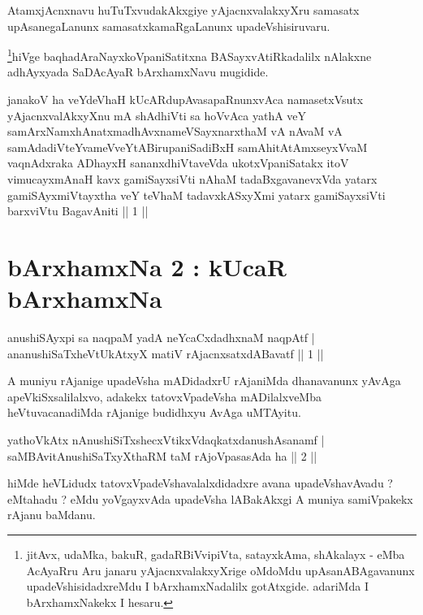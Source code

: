 \begin{artha}
AtamxjAcnxnavu huTuTxvudakAkxgiye yAjacnxvalakxyXru samasatx upAsanegaLanunx samasatxkamaRgaLanunx upadeVshisiruvaru.
\end{artha}

\begin{artha}
\footnote{jitAvx, udaMka, bakuR, gadaRBiVvipiVta, satayxkAma, shAkalayx - eMba AcAyaRru Aru janaru yAjacnxvalakxyXrige oMdoMdu upAsanABAgavanunx upadeVshisidadxreMdu I bArxhamxNadalilx gotAtxgide. adariMda I bArxhamxNakekx I hesaru.}hiVge baqhadAraNayxkoVpaniSatitxna BASayxvAtiRkadalilx nAlakxne adhAyxyada SaDAcAyaR bArxhamxNavu mugidide.
\end{artha}
	
\begin{shl}
janakoV ha veYdeVhaH kUcARdupAvasapaRnunxvAca namasetxV\s sutx yAjacnxvalAkxyXnu mA shAdhiVti sa hoVvAca yathA veY samArxNamxhAnatxmadhAvxnameVSayxnarxthaM vA nAvaM vA samAdadiVteYvameVveYtABirupaniSadiBxH samAhitAtAmxseyxVvaM vaqnAdxraka ADhayxH sananxdhiVtaveVda ukotxVpaniSatakx itoV vimucayxmAnaH kavx gamiSayxsiVti nAhaM tadaBxgavanevxVda yatarx gamiSAyxmiVtayxtha veY teV\s haM tadavxkASxyXmi yatarx gamiSayxsiVti barxviVtu BagavAniti || 1 ||
\end{shl}	
	
\section*{bArxhamxNa 2 : kUcaR bArxhamxNa}

\begin{shl}
anushiSAyxpi sa naqpaM yadA neYcaCxdadhxnaM naqpAtf |\\
ananushiSaTxheVtUkAtxyX matiV rAjacnxsatxdA\s Bavatf \hfill || 1 || 
\end{shl}

\begin{artha}
A muniyu rAjanige upadeVsha mADidadxrU rAjaniMda dhanavanunx yAvAga apeVkiSxsalilalxvo, adakekx tatovxVpadeVsha mADilalxveMba heVtuvacanadiMda rAjanige budidhxyu AvAga uMTAyitu.
\end{artha}

\begin{shl}
yathoVkAtx nAnushiSiTxshecxVtikxVdaqkatxdanushAsanamf |\\
saMBAvitAnushiSaTxyXthaRM taM rAjoVpasasAda ha \hfill || 2 || 
\end{shl}

\begin{artha}
hiMde heVLidudx tatovxVpadeVshavalalxdidadxre avana upadeVshavAvadu ? eMtahadu ? eMdu yoVgayxvAda upadeVsha lABakAkxgi A muniya samiVpakekx rAjanu baMdanu.
\end{artha}

